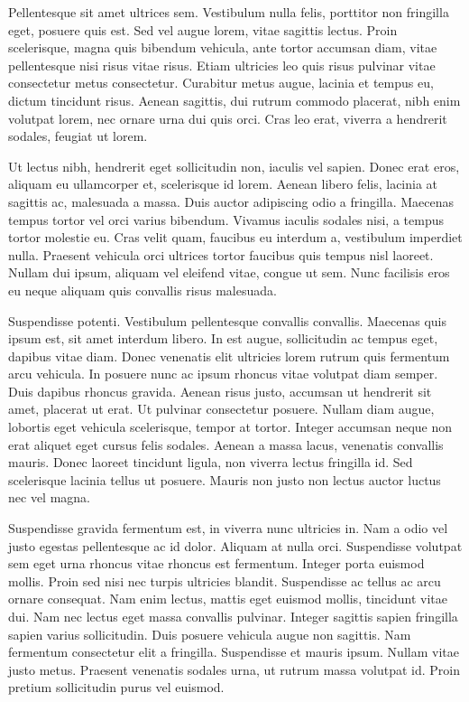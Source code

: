 \documentclass[12pt, a4paper]{article}
\begin{document}
Pellentesque sit amet ultrices sem. Vestibulum nulla felis, porttitor non
fringilla eget, posuere quis est. Sed vel augue lorem, vitae sagittis lectus.
Proin scelerisque, magna quis bibendum vehicula, ante tortor accumsan diam,
vitae pellentesque nisi risus vitae risus. Etiam ultricies leo quis risus
pulvinar vitae consectetur metus consectetur. Curabitur metus augue, lacinia et
tempus eu, dictum tincidunt risus. Aenean sagittis, dui rutrum commodo
placerat, nibh enim volutpat lorem, nec ornare urna dui quis orci. Cras leo
erat, viverra a hendrerit sodales, feugiat ut lorem.

Ut lectus nibh, hendrerit eget sollicitudin non, iaculis vel sapien. Donec erat
eros, aliquam eu ullamcorper et, scelerisque id lorem. Aenean libero felis,
lacinia at sagittis ac, malesuada a massa. Duis auctor adipiscing odio
a fringilla. Maecenas tempus tortor vel orci varius bibendum. Vivamus iaculis
sodales nisi, a tempus tortor molestie eu. Cras velit quam, faucibus eu
interdum a, vestibulum imperdiet nulla. Praesent vehicula orci ultrices tortor
faucibus quis tempus nisl laoreet. Nullam dui ipsum, aliquam vel eleifend
vitae, congue ut sem. Nunc facilisis eros eu neque aliquam quis convallis risus
malesuada.

Suspendisse potenti. Vestibulum pellentesque convallis convallis. Maecenas quis
ipsum est, sit amet interdum libero. In est augue, sollicitudin ac tempus eget,
dapibus vitae diam. Donec venenatis elit ultricies lorem rutrum quis fermentum
arcu vehicula. In posuere nunc ac ipsum rhoncus vitae volutpat diam semper.
Duis dapibus rhoncus gravida. Aenean risus justo, accumsan ut hendrerit sit
amet, placerat ut erat. Ut pulvinar consectetur posuere. Nullam diam augue,
lobortis eget vehicula scelerisque, tempor at tortor. Integer accumsan neque
non erat aliquet eget cursus felis sodales. Aenean a massa lacus, venenatis
convallis mauris. Donec laoreet tincidunt ligula, non viverra lectus fringilla
id. Sed scelerisque lacinia tellus ut posuere. Mauris non justo non lectus
auctor luctus nec vel magna.

Suspendisse gravida fermentum est, in viverra nunc ultricies in. Nam a odio vel
justo egestas pellentesque ac id dolor. Aliquam at nulla orci. Suspendisse
volutpat sem eget urna rhoncus vitae rhoncus est fermentum. Integer porta
euismod mollis. Proin sed nisi nec turpis ultricies blandit. Suspendisse ac
tellus ac arcu ornare consequat. Nam enim lectus, mattis eget euismod mollis,
tincidunt vitae dui. Nam nec lectus eget massa convallis pulvinar. Integer
sagittis sapien fringilla sapien varius sollicitudin. Duis posuere vehicula
augue non sagittis. Nam fermentum consectetur elit a fringilla. Suspendisse et
mauris ipsum. Nullam vitae justo metus. Praesent venenatis sodales urna, ut
rutrum massa volutpat id. Proin pretium sollicitudin purus vel euismod.
\end{document}
